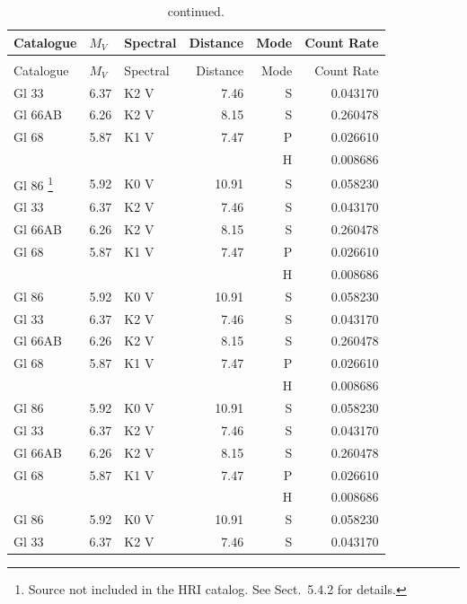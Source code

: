 \documentclass{aa}
\begin{document}
\begin{appendix}
\begin{landscape}
\begin{longtable}{lllrrr}
			Catalogue & $M_{V}$ & Spectral & Distance & Mode & Count Rate \\
			\hline
			\endfirsthead
			\caption{continued.}                                          \\
			\hline\hline
			Catalogue & $M_{V}$ & Spectral & Distance & Mode & Count Rate \\
			\hline
			\endhead
			\hline
			\endfoot
			Gl 33     & 6.37    & K2 V     & 7.46     & S    & 0.043170   \\
			Gl 66AB   & 6.26    & K2 V     & 8.15     & S    & 0.260478   \\
			Gl 68     & 5.87    & K1 V     & 7.47     & P    & 0.026610   \\
			          &         &          &          & H    & 0.008686   \\
			Gl 86
			\footnote{Source not included in the HRI catalog. See Sect.~5.4.2 for details.}
			          & 5.92    & K0 V     & 10.91    & S    & 0.058230   \\
			Gl 33     & 6.37    & K2 V     & 7.46     & S    & 0.043170   \\
			Gl 66AB   & 6.26    & K2 V     & 8.15     & S    & 0.260478   \\
			Gl 68     & 5.87    & K1 V     & 7.47     & P    & 0.026610   \\
			          &         &          &          & H    & 0.008686   \\
			Gl 86     & 5.92    & K0 V     & 10.91    & S    & 0.058230   \\
			Gl 33     & 6.37    & K2 V     & 7.46     & S    & 0.043170   \\
			Gl 66AB   & 6.26    & K2 V     & 8.15     & S    & 0.260478   \\
			Gl 68     & 5.87    & K1 V     & 7.47     & P    & 0.026610   \\
			          &         &          &          & H    & 0.008686   \\
			Gl 86     & 5.92    & K0 V     & 10.91    & S    & 0.058230   \\   Gl 33    & 6.37 & K2 V & 7.46 & S & 0.043170\\
			Gl 66AB   & 6.26    & K2 V     & 8.15     & S    & 0.260478   \\
			Gl 68     & 5.87    & K1 V     & 7.47     & P    & 0.026610   \\
			          &         &          &          & H    & 0.008686   \\
			Gl 86     & 5.92    & K0 V     & 10.91    & S    & 0.058230   \\   Gl 33    & 6.37 & K2 V & 7.46 & S & 0.043170\\

\end{longtable}
\end{landscape}
\end{appendix}
\end{document}
